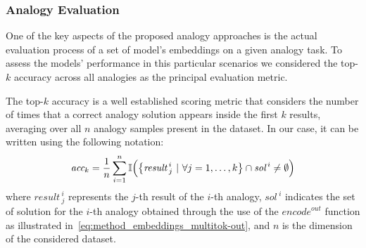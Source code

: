\subsubsection{Analogy Evaluation}\label{subsubsec:method_embeddings_evaluation}

One of the key aspects of the proposed analogy approaches is the actual evaluation process of a set of model's embeddings on a given analogy task.
To assess the models' performance in this particular scenarios we considered the top-$k$ accuracy across all analogies as the principal evaluation metric.

The top-$k$ accuracy is a well established scoring metric that considers the number of times that a correct analogy solution appears inside the first $k$ results, averaging over all $n$ analogy samples present in the dataset.
In our case, it can be written using the following notation:
\begin{equation}
    \label{eq:method_embeddings_topk-accuracy}
    \textit{acc}_k = \frac{1}{n} \sum_{i=1}^{n} \mathbb{I}\Bigl( {\left\{ {\textit{result}\,}^i_j \ |\ \forall j = 1,\ldots,k \right\}} \cap {\textit{sol}\,}^i \neq \emptyset \Bigr)
\end{equation}
where ${\textit{result}\,}^i_j$ represents the $j$-th result of the $i$-th analogy, ${\textit{sol}\,}^i$ indicates the set of solution for the $i$-th analogy obtained through the use of the ${\textit{encode}}^{out}$ function as illustrated in~\cref{eq:method_embeddings_multitok-out}, and $n$ is the dimension of the considered dataset.


